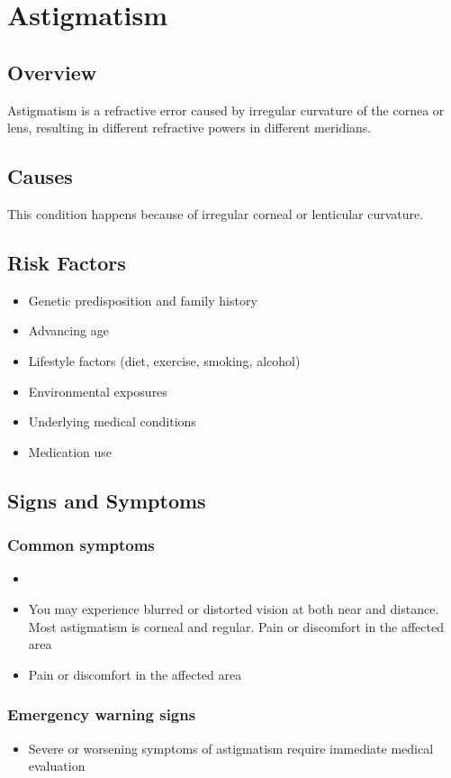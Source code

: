 \chapter{Astigmatism}
\label{sec:Astigmatism}

\section{Overview}
Astigmatism is a refractive error caused by irregular curvature of the cornea or lens, resulting in different refractive powers in different meridians.
\section{Causes}
This condition happens because of irregular corneal or lenticular curvature.     
\section{Risk Factors}

\begin{itemize}[noitemsep]
  \item Genetic predisposition and family history
  \item Advancing age
  \item Lifestyle factors (diet, exercise, smoking, alcohol)
  \item Environmental exposures
  \item Underlying medical conditions
  \item Medication use
\end{itemize}
\section{Signs and Symptoms}

\subsection{Common symptoms}
\begin{itemize}[noitemsep]
  \item \item You may experience blurred or distorted vision at both near and distance. Most astigmatism is corneal and regular. Pain or discomfort in the affected area    \item Pain or discomfort in the affected area
  \end{itemize}

\subsection{Emergency warning signs}
\begin{itemize}[noitemsep]
  \item Severe or worsening symptoms of astigmatism require immediate medical evaluation
\end{itemize}
